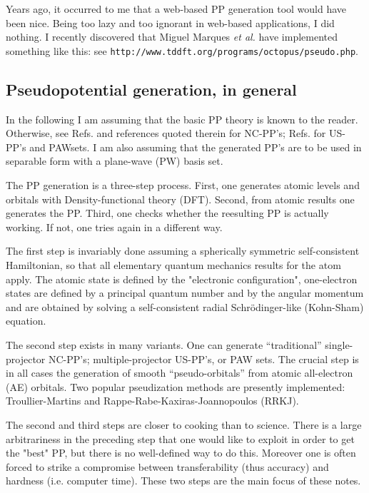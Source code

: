 \documentclass[12pt,a4paper]{article}
\begin{document}
Years ago, it occurred to me that a web-based PP generation
tool would have been nice. Being too lazy and too ignorant 
in web-based applications, I did nothing.
I recently discovered that Miguel Marques {\em et al.} have
implemented something like this: see
{\tt http://www.tddft.org/programs/octopus/pseudo.php}.

\subsection{Pseudopotential generation, in general} 

In the following I am assuming that the basic PP theory 
is known to the reader. Otherwise, see 
Refs.\cite{NC,BHS,TM,fhi98PP,RRKJ} and references quoted 
therein for NC-PP's; Refs.\cite{van,PAW} for US-PP's and PAWsets. 
I am also assuming that the generated PP's are to be used
in separable form \cite{KB} with a plane-wave (PW) basis set.

The PP generation is a three-step process. First, one generates
atomic levels and orbitals with Density-functional theory (DFT). 
Second, from atomic results one generates the PP. Third, one checks 
whether the reesulting PP is actually working. If not, one tries again in 
a different way.

The first step is invariably done assuming a spherically symmetric
self-consistent Hamiltonian, so that all elementary quantum mechanics 
results for the atom apply. The atomic state is defined by the
"electronic configuration", one-electron states are defined by a
principal quantum number and by the angular momentum and are obtained
by solving a self-consistent radial Schr\"odinger-like (Kohn-Sham)
equation.

The second step exists in many variants. One can generate ``traditional'' 
single-projector NC-PP's; multiple-projector US-PP's, or PAW sets.
The crucial step is in all cases the generation of smooth
``pseudo-orbitals''  from atomic all-electron (AE) orbitals. 
Two popular pseudization
methods are presently implemented: Troullier-Martins \cite{TM}
and Rappe-Rabe-Kaxiras-Joannopoulos \cite{RRKJ} (RRKJ).

The second and third steps are closer to cooking than to science. 
There is a
large arbitrariness in the preceding step that one would like to 
exploit in order to get the "best" PP, but there is no well-defined
way to do this. Moreover one is often forced to strike a compromise
between transferability (thus accuracy) and hardness (i.e. computer 
time). These two steps are the main focus of these notes.
\end{document}
